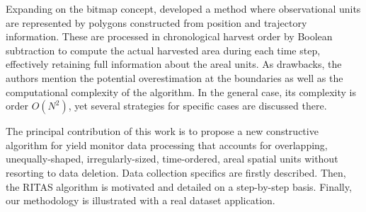 Expanding on the bitmap concept, \cite{Drummond1999} developed a
method where observational units are represented by polygons
constructed from position and trajectory information. These are
processed in chronological harvest order by Boolean subtraction to
compute the actual harvested area during each time step, effectively
retaining full information about the areal units. As drawbacks, the
authors mention the potential overestimation at the boundaries as well
as the computational complexity of the algorithm. In the general case,
its complexity is order $O(N^2)$, yet several strategies for specific
cases are discussed there.

The principal contribution of this work is to propose a new
constructive algorithm for yield monitor data processing that accounts
for overlapping, unequally-shaped, irregularly-sized, time-ordered,
areal spatial units without resorting to data deletion. Data
collection specifics are firstly described. Then, the RITAS algorithm
is motivated and detailed on a step-by-step basis. Finally, our
methodology is illustrated with a real dataset application.

